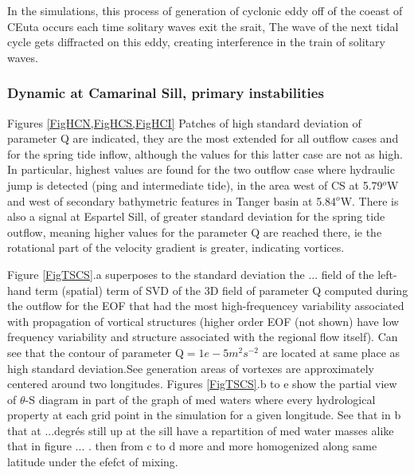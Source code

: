 In the simulations, this process of generation of cyclonic eddy off of the coeast of CEuta occurs each time solitary waves exit the srait,  The wave of the next tidal cycle gets diffracted on this eddy, creating interference in the train of solitary waves.



\subsubsection{Dynamic at Camarinal Sill, primary instabilities}


Figures \ref{FigHCN,FigHCS,FigHCI}  Patches of high standard deviation of parameter Q are indicated, they are the most extended for all outflow cases and for the spring tide inflow, although the values for this latter case are not as high. In particular, highest values are found for the two outflow case where hydraulic jump is detected (ping and intermediate tide), in the area west of CS at 5.79$^o$W and west of secondary bathymetric features in Tanger basin at 5.84$^o$W. There is also a signal at Espartel Sill, of greater standard deviation for the spring tide outflow, meaning higher values for the parameter Q are reached there, ie the rotational part of the velocity gradient is greater, indicating vortices. 

Figure \ref{FigTSCS}.a superposes to the standard deviation the ... field of the left-hand term (spatial) term of SVD of the 3D field of parameter Q computed during the outflow for the EOF that had the most high-frequencey variability associated with propagation of vortical structures (higher order EOF (not shown) have low frequency variability and structure associated with the regional flow itself). Can see that the contour of parameter Q$=1e-5m^2s^{-2}$ are located at same place as high standard deviation.See generation areas of vortexes are approximately centered around two longitudes. Figures \ref{FigTSCS}.b to e show the partial view of $\theta$-S diagram in part of the graph of med waters where every hydrological property at each grid point in the simulation for a given longitude. See that in b that at ...degrés still up at the sill have a repartition of med water masses alike that in figure ... . then from c to d more and more homogenized along same latitude under the efefct of mixing.


